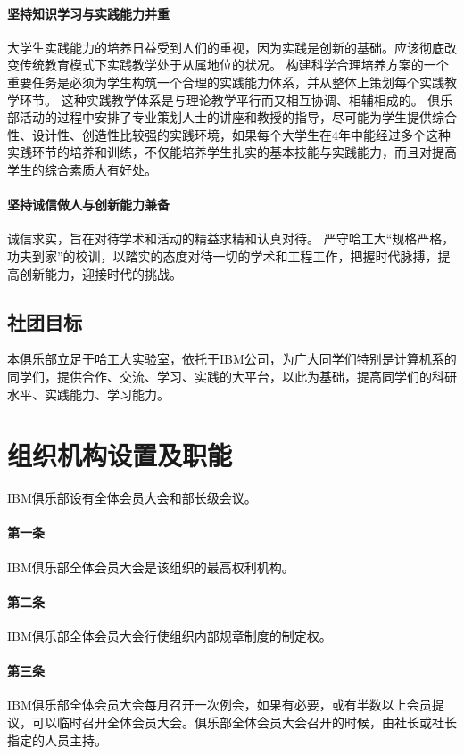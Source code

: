 \documentclass{club}
\begin{document}
\paragraph{坚持知识学习与实践能力并重}大学生实践能力的培养日益受到人们的重视，因为实践是创新的基础。应该彻底改变传统教育模式下实践教学处于从属地位的状况。
构建科学合理培养方案的一个重要任务是必须为学生构筑一个合理的实践能力体系，并从整体上策划每个实践教学环节。
这种实践教学体系是与理论教学平行而又相互协调、相辅相成的。
俱乐部活动的过程中安排了专业策划人士的讲座和教授的指导，尽可能为学生提供综合性、设计性、创造性比较强的实践环境，如果每个大学生在4年中能经过多个这种实践环节的培养和训练，不仅能培养学生扎实的基本技能与实践能力，而且对提高学生的综合素质大有好处。

\paragraph{坚持诚信做人与创新能力兼备}诚信求实，旨在对待学术和活动的精益求精和认真对待。
严守哈工大“规格严格，功夫到家”的校训，以踏实的态度对待一切的学术和工程工作，把握时代脉搏，提高创新能力，迎接时代的挑战。

\subsection{社团目标}

本俱乐部立足于哈工大实验室，依托于IBM公司，为广大同学们特别是计算机系的同学们，提供合作、交流、学习、实践的大平台，以此为基础，提高同学们的科研水平、实践能力、学习能力。

\section{组织机构设置及职能}

IBM俱乐部设有全体会员大会和部长级会议。

\paragraph{第一条}IBM俱乐部全体会员大会是该组织的最高权利机构。
\paragraph{第二条}IBM俱乐部全体会员大会行使组织内部规章制度的制定权。
\paragraph{第三条}IBM俱乐部全体会员大会每月召开一次例会，如果有必要，或有半数以上会员提议，可以临时召开全体会员大会。俱乐部全体会员大会召开的时候，由社长或社长指定的人员主持。
\end{document}
